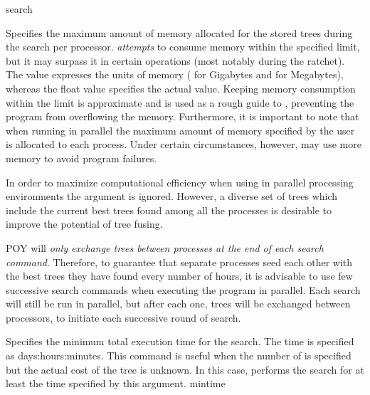 \begin{command}{search}{}
\begin{arguments}
            {Specifies the maximum amount of memory allocated for the stored
            trees during the search per processor.  \poy \emph{attempts} to
            consume memory within the specified limit, but it may surpass it in
            certain operations (most notably during the ratchet). The \poylident
            value expresses the units of memory ( for Gigabytes
            and  for Megabytes), whereas the float value
            specifies the actual value. Keeping memory consumption within the
            limit is approximate and is used as a rough guide to \poy,
            preventing the program from overflowing the memory.  Furthermore, it
            is important to note that when running \poy in parallel the maximum
            amount of memory specified by the user is allocated to each process.
            Under certain circumstances, however, \poy may use more memory to
            avoid program failures.}
            {}

        \begin{statement}
            In order to maximize computational efficiency when using  
            in parallel processing environments the 
            argument is ignored. However, a diverse set of trees which
            include the current best trees found among all the processes is
            desirable to improve the potential of tree fusing.

            \indent POY will \emph{only exchange trees between processes at the end
            of each search command}. Therefore,
            to guarantee that separate processes seed each other with the
            best trees they have found every number of hours,
            it is advisable to use few successive search commands
            when executing the program in parallel. Each search will still
            be run in parallel, but after each one, trees will be exchanged
            between processors, to initiate each successive round of search.
        \end{statement}
        
            {Specifies the minimum total execution time for the search. The time is specified as
            days:hours:minutes. This command is useful when the number of
             is specified but the actual cost of the tree is
            unknown. In this case, \poy performs the search for at least the
            time specified by this argument.}
            {mintime}


\end{arguments}
\end{command}
